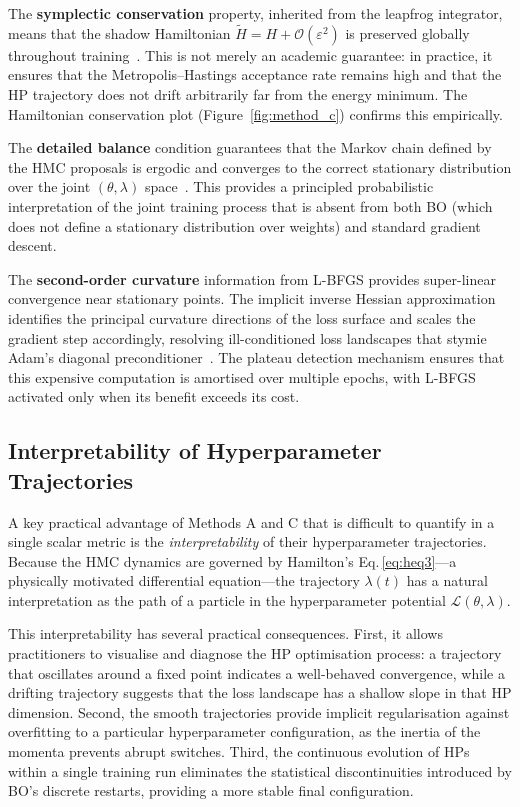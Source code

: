 \documentclass[12pt,a4paper]{article}
\begin{document}
The \textbf{symplectic conservation} property, inherited from the
leapfrog integrator, means that the shadow Hamiltonian
$\tilde{H} = H + \mathcal{O}(\varepsilon^2)$ is preserved globally
throughout training~\cite{hairer2006}.  This is not merely an academic
guarantee: in practice, it ensures that the Metropolis--Hastings
acceptance rate remains high and that the HP trajectory does not drift
arbitrarily far from the energy minimum.  The Hamiltonian conservation
plot (Figure~\ref{fig:method_c}) confirms this empirically.

The \textbf{detailed balance} condition guarantees that the Markov
chain defined by the HMC proposals is ergodic and converges to the
correct stationary distribution over the joint $(\theta, \lambda)$
space~\cite{betancourt2017}.  This provides a principled probabilistic
interpretation of the joint training process that is absent from both
BO (which does not define a stationary distribution over weights) and
standard gradient descent.

The \textbf{second-order curvature} information from L-BFGS provides
super-linear convergence near stationary points.  The implicit inverse
Hessian approximation identifies the principal curvature directions of
the loss surface and scales the gradient step accordingly, resolving
ill-conditioned loss landscapes that stymie Adam's diagonal
preconditioner~\cite{liu1989lbfgs}.  The plateau detection mechanism
ensures that this expensive computation is amortised over multiple
epochs, with L-BFGS activated only when its benefit exceeds its cost.

\subsection{Interpretability of Hyperparameter Trajectories}

A key practical advantage of Methods A and C that is difficult to
quantify in a single scalar metric is the \emph{interpretability} of
their hyperparameter trajectories.  Because the HMC dynamics are
governed by Hamilton's Eq.\,\eqref{eq:heq3}—a physically motivated
differential equation—the trajectory $\lambda(t)$ has a natural
interpretation as the path of a particle in the hyperparameter
potential $\mathcal{L}(\theta, \lambda)$.

This interpretability has several practical consequences.  First, it
allows practitioners to visualise and diagnose the HP optimisation
process: a trajectory that oscillates around a fixed point indicates
a well-behaved convergence, while a drifting trajectory suggests that
the loss landscape has a shallow slope in that HP dimension.  Second,
the smooth trajectories provide implicit regularisation against
overfitting to a particular hyperparameter configuration, as the inertia
of the momenta prevents abrupt switches.  Third, the continuous evolution
of HPs within a single training run eliminates the statistical
discontinuities introduced by BO's discrete restarts, providing a more
stable final configuration.
\end{document}
